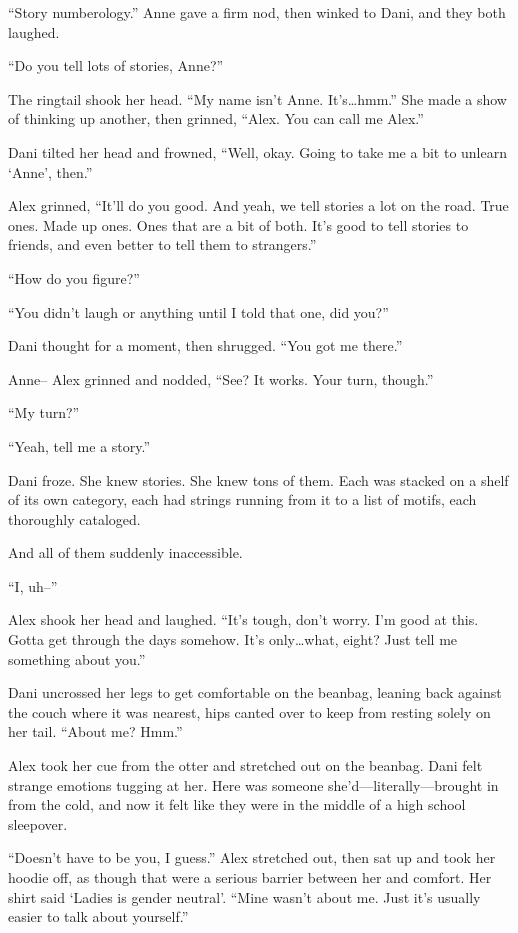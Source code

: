 ``Story numberology.'' Anne gave a firm nod, then winked to Dani, and they both laughed.

``Do you tell lots of stories, Anne?''

The ringtail shook her head. ``My name isn't Anne. It's\ldots{}hmm.'' She made a show of thinking up another, then grinned, ``Alex. You can call me Alex.''

Dani tilted her head and frowned, ``Well, okay. Going to take me a bit to unlearn `Anne', then.''

Alex grinned, ``It'll do you good. And yeah, we tell stories a lot on the road. True ones. Made up ones. Ones that are a bit of both. It's good to tell stories to friends, and even better to tell them to strangers.''

``How do you figure?''

``You didn't laugh or anything until I told that one, did you?''

Dani thought for a moment, then shrugged. ``You got me there.''

Anne-- Alex grinned and nodded, ``See? It works. Your turn, though.''

``My turn?''

``Yeah, tell me a story.''

Dani froze. She knew stories. She knew tons of them. Each was stacked on a shelf of its own category, each had strings running from it to a list of motifs, each thoroughly cataloged.

And all of them suddenly inaccessible.

``I, uh--''

Alex shook her head and laughed. ``It's tough, don't worry. I'm good at this. Gotta get through the days somehow. It's only\ldots{}what, eight? Just tell me something about you.''

Dani uncrossed her legs to get comfortable on the beanbag, leaning back against the couch where it was nearest, hips canted over to keep from resting solely on her tail. ``About me? Hmm.''

Alex took her cue from the otter and stretched out on the beanbag. Dani felt strange emotions tugging at her. Here was someone she'd---literally---brought in from the cold, and now it felt like they were in the middle of a high school sleepover.

``Doesn't have to be you, I guess.'' Alex stretched out, then sat up and took her hoodie off, as though that were a serious barrier between her and comfort. Her shirt said `Ladies is gender neutral'. ``Mine wasn't about me. Just it's usually easier to talk about yourself.''

